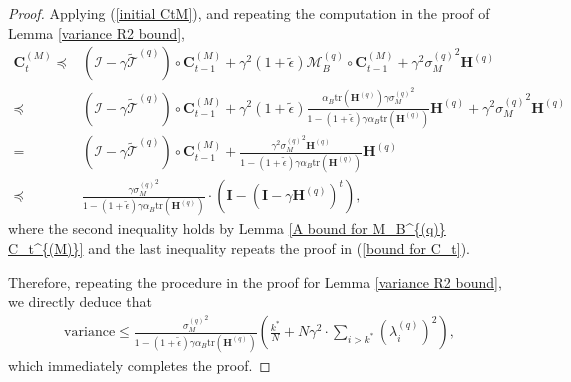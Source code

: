 \documentclass[11pt, letterpaper]{article}
\begin{document}
\begin{proof}
    Applying (\ref{initial CtM}), and repeating the computation in the proof of Lemma \ref{variance R2 bound},
    \begin{equation*}
        \begin{aligned}
            \mathbf{C}_t^{(M)}\preceq&(\mathcal{I}-\gamma\widetilde{\mathcal{T}}^{(q)})\circ \mathbf{C}_{t-1}^{(M)}+\gamma^2(1+\tilde{\epsilon})\mathcal{M}_B^{(q)}\circ \mathbf{C}_{t-1}^{(M)}+\gamma^2{\sigma_M^{(q)}}^2\mathbf{H}^{(q)}\\
            \preceq&(\mathcal{I}-\gamma\widetilde{\mathcal{T}}^{(q)})\circ \mathbf{C}_{t-1}^{(M)}+\gamma^2(1+\tilde{\epsilon})\frac{\alpha_B\mathrm{tr}(\mathbf{H}^{(q)})\gamma{\sigma_M^{(q)}}^2}{1-(1+\tilde{\epsilon})\gamma\alpha_B\mathrm{tr}(\mathbf{H}^{(q)})} \mathbf{H}^{(q)}+\gamma^2{\sigma_M^{(q)}}^2\mathbf{H}^{(q)}\\
            =&(\mathcal{I}-\gamma\widetilde{\mathcal{T}}^{(q)})\circ \mathbf{C}_{t-1}^{(M)}+\frac{\gamma^2{\sigma_M^{(q)}}^2\mathbf{H}^{(q)}}{1-(1+\tilde{\epsilon})\gamma\alpha_B\mathrm{tr}(\mathbf{H}^{(q)})} \mathbf{H}^{(q)}\\
            \preceq &\frac{\gamma{\sigma_M ^{(q)}}^2}{1-(1+\tilde{\epsilon})\gamma\alpha_B\mathrm{tr}(\mathbf{H}^{(q)})}\cdot\left(\mathbf{I}-(\mathbf{I}-\gamma\mathbf{H}^{(q)})^t\right),
        \end{aligned}
    \end{equation*}
    where the second inequality holds by Lemma \ref{A bound for M_B^{(q)} C_t^{(M)}} and the last inequality repeats the proof in (\ref{bound for C_t}).

    Therefore, repeating the procedure in the proof for Lemma \ref{variance R2 bound}, we directly deduce that
    \begin{equation*}
        \begin{aligned}
            \mathrm{variance}\leq  \frac{{\sigma_M^{(q)}}^2}{1-(1+\tilde{\epsilon})\gamma\alpha_B\mathrm{tr}(\mathbf{H}^{(q)})}\left(\frac{k^*}{N}+N\gamma^2\cdot\sum_{i>k^*}(\lambda_i^{(q)})^2\right),
        \end{aligned}
    \end{equation*}
    which immediately completes the proof.
\end{proof}
\end{document}
